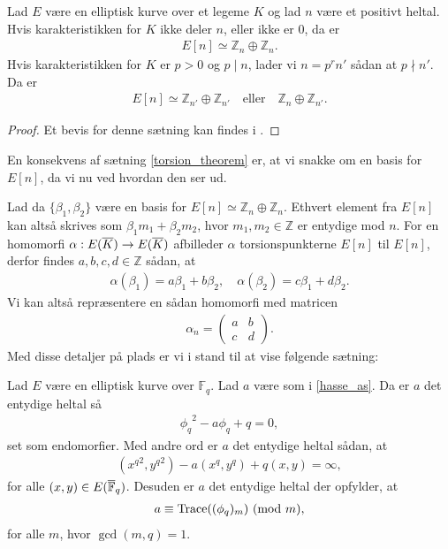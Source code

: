 \begin{thm}
\label{torsion_theorem}
Lad $E$ være en elliptisk kurve over et legeme $K$ og lad $n$ være et positivt heltal. Hvis karakteristikken for $K$ ikke deler $n$, eller ikke er $0$, da er
\begin{align*}
	E[n] \simeq \mathbb{Z}_n \oplus \mathbb{Z}_n.
\end{align*}
Hvis karakteristikken for $K$ er $p > 0$ og $p \mid n$, lader vi $n=p^r n'$ sådan at $p \nmid n'$. Da er
\begin{align*}
	E[n] \simeq \mathbb{Z}_{n'} \oplus \mathbb{Z}_{n'} \quad \text{eller} \quad \mathbb{Z}_n 
	\oplus \mathbb{Z}_{n'}.
\end{align*}
\end{thm}
\begin{proof}
Et bevis for denne sætning kan findes i \cite[s.~79]{Washington}.
\end{proof}
En konsekvens af sætning \ref{torsion_theorem} er, at vi snakke om en basis for $E[n]$, da vi nu ved hvordan den ser ud.

Lad da $\{\beta_1, \beta_2\}$ være en basis for $E[n] \simeq \mathbb{Z}_n \oplus \mathbb{Z}_n$. Ethvert element fra $E[n]$ kan altså skrives som $\beta_1 m_1 + \beta_2 m_2$, hvor $m_1, m_2 \in \mathbb{Z}$ er entydige mod $n$. For en homomorfi $\alpha : E(\overline{K}) \to E(\overline{K})$ afbilleder $\alpha$ torsionspunkterne $E[n]$ til $E[n]$, derfor findes $a, b, c, d \in \mathbb{Z}$ sådan, at 
\begin{align*}
	\alpha(\beta_1) = a \beta_1 + b \beta_2, \quad \alpha(\beta_2) = c\beta_1 + d \beta_2.
\end{align*}
Vi kan altså repræsentere en sådan homomorfi med matricen
\begin{align*}
	\alpha_n = \left( 
	\begin{matrix}
		a & b \\ 
		c & d 
	\end{matrix} \right).
\end{align*}
Med disse detaljer på plads er vi i stand til at vise følgende sætning:
\begin{thm}
\label{trace_theorem}
Lad $E$ være en elliptisk kurve over $\mathbb{F}_q$. Lad $a$ være som i \eqref{hasse_as}. Da er $a$ det
entydige heltal så
\begin{align*}
	{\phi_q}^2 - a \phi_q + q = 0,
\end{align*}
set som endomorfier. Med andre ord er $a$ det entydige heltal sådan, at 
\begin{align*}
	({x^q}^2, {y^q}^2) - a(x^q, y^q) + q(x, y) = \infty,
\end{align*}
for alle $(x, y) \in E(\overline{\mathbb{F}}_q)$. Desuden er $a$ det entydige heltal der opfylder, at
\begin{align*}
	a \equiv \text{Trace}((\phi_q)_m) \ (\mathrm{mod} \ m),
\end{align*}
for alle $m$, hvor $\gcd(m, q)=1$.
\end{thm}

